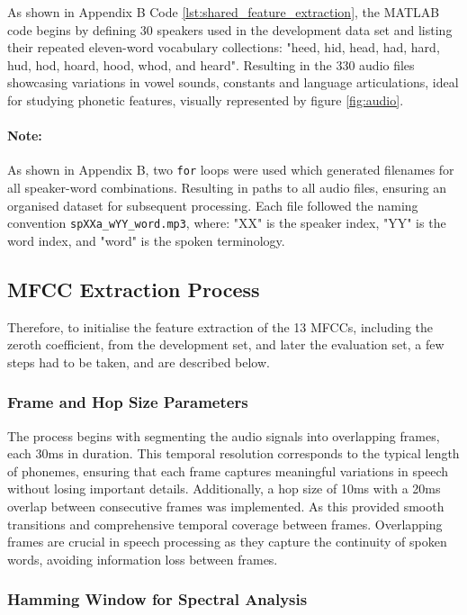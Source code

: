 \documentclass{article}
\begin{document}
As shown in Appendix B Code \ref{lst:shared_feature_extraction}, the MATLAB code begins by defining 30 speakers used in the development data set and listing their repeated eleven-word vocabulary collections: "heed, hid, head, had, hard, hud, hod, hoard, hood, whod, and heard". Resulting in the 330 audio files showcasing variations in vowel sounds, constants and language articulations, ideal for studying phonetic features, visually represented by figure \ref{fig:audio}.

\paragraph{Note:} As shown in Appendix B, two \verb+for+ loops were used which generated filenames for all speaker-word combinations. Resulting in paths to all audio files, ensuring an organised dataset for subsequent processing. Each file followed the naming convention \verb+spXXa_wYY_word.mp3+, where: "XX" is the speaker index, "YY" is the word index, and "word" is the spoken terminology.

\subsection{MFCC Extraction Process}

Therefore, to initialise the feature extraction of the 13 MFCCs, including the zeroth coefficient, from the development set, and later the evaluation set, a few steps had to be taken, and are described below. 

\subsubsection{Frame and Hop Size Parameters}

The process begins with segmenting the audio signals into overlapping frames, each 30ms in duration. This temporal resolution corresponds to the typical length of phonemes, ensuring that each frame captures meaningful variations in speech without losing important details. Additionally, a hop size of 10ms with a 20ms overlap between consecutive frames was implemented. As this provided smooth transitions and comprehensive temporal coverage between frames. Overlapping frames are crucial in speech processing as they capture the continuity of spoken words, avoiding information loss between frames.

\subsubsection{Hamming Window for Spectral Analysis}
\end{document}
